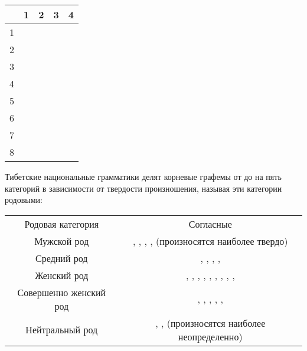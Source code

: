 \begin{tabularx}{\textwidth}{|C{1}|C{1}|C{1}|C{1}|C{1}|}
	\caption{Корневые графемы тибетского языка}\label{tab:1}
	\\
		\hline
	 & 1 & 2 & 3 & 4\\
	 &  \toneR &  \toneR &  \toneV &  \toneV \\
	2 &  \toneR &  \toneR &  \toneV &  \toneV \\
	3 &  \toneR &  \toneR &  \toneV &  \toneV \\
	4 &  \toneR &  \toneR &  \toneV &  \toneV \\
	5 &  \toneR &  \toneR &  \toneV &  \toneV \\
	6 &  \toneV &  \toneV &  \toneV &  \toneV \\
	7 &  \toneV &  \toneV &  \toneR &  \toneR \\
	8 &  \toneR &  & & \\
	\hline
\end{tabularx}

Тибетские национальные грамматики делят корневые графемы от  до  на пять категорий в зависимости от твердости  произношения, называя эти категории родовыми:

\begin{tabularx}{\textwidth}{C{1}|C{1}}
	Родовая категория & Согласные\\
	Мужской род  & , , , ,  (произносятся наиболее твердо)\\
	Средний род  & , , , , \\
	Женский род  & , , , , , , , , , \\
	Совершенно женский род  & , , , , , \\
	Нейтральный род  & , ,  (произносятся наиболее неопределенно)
\end{tabularx}

